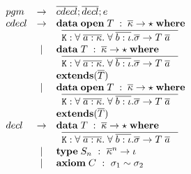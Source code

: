 {\begin{figure}[H]
\begin{minipage}[t]{0.5\linewidth}
\end{minipage}
\begin{minipage}[t]{0.5\linewidth}
\vspace{5mm}
\vspace{2mm}

$
\begin{array}{lcl}
  pgm & \to & \overline{cdecl}; \overline{decl}; e \\
  cdecl & \to & \mathbf{data}\;\mathbf{open}\;{T\; : \; \overline{\kappa} \to \star \;\mathbf{where}\;} \\
  & & \;\; \overline{{\tt K} : \forall\; \overline{a:\kappa}.\;
  \forall\;\overline{b : \iota}. \overline{\sigma} \to T\; \overline{a}
       \;\;\;}  \\
  & \;|\; & \mathbf{data}\;{T\; : \; \overline{\kappa} \to \star \;\mathbf{where}\;} \\
  & & \;\; \overline{{\tt K} : \forall\; \overline{a:\kappa}.\;
  \forall\;\overline{b : \iota}. \overline{\sigma} \to T\; \overline{a}
       \;\;\;} \\
  & & \mathbf{extends}(\overline{T})\\
  & \;|\; & \mathbf{data}\;\mathbf{open}\;{T\; : \; \overline{\kappa} \to \star \;\mathbf{where}\;} \\
  & & \;\; \overline{{\tt K} : \forall\; \overline{a:\kappa}.\;
  \forall\;\overline{b : \iota}. \overline{\sigma} \to T\; \overline{a}
       \;\;\;} \\
  & & \mathbf{extends}(\overline{T})\\
  decl & \to & \mathbf{data}\;{T\; : \; \overline{\kappa} \to \star \;\mathbf{where}\;} \\
  & & \;\; \overline{{\tt K} : \forall\; \overline{a:\kappa}.\;
  \forall\;\overline{b : \iota}. \overline{\sigma} \to T\; \overline{a}
       \;\;\;}  \\
  & \;|\; & \mathbf{type}\; S_n ~:~ \overline{\kappa}^n \to \iota \\
  & \;|\; & \mathbf{axiom}\; C ~:~ \sigma_1 \sim \sigma_2
\end{array}
$
\end{minipage}


\begin{minipage}[t]{0.45\linewidth}
\vspace{5mm}
\vspace{2mm}


\end{minipage}
\end{figure}}
